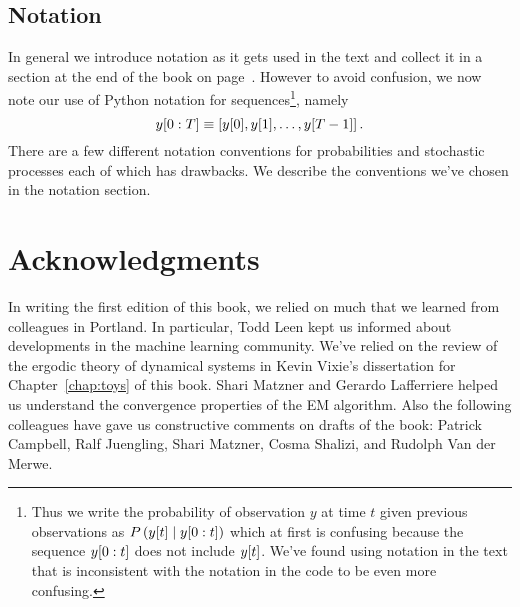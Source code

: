 \documentclass[ltxbook, commentsvisible]{hmmdsbook}
\begin{document}

\subsection*{Notation}
\label{preface_notation}

In general we introduce notation as it gets used in the text and
collect it in a section at the end of the book on
page~\pageref{sec:notation}.  However to avoid confusion, we now note
our use of Python notation for sequences\footnote{Thus we write the
  probability of observation $y$ at time $t$ given previous
  observations as $P\left( {y}{[t]} \mid y[0:t] \right)$
  which at first is confusing because the sequence $y[0:t]$ does
  not include ${y}{[t]}$.  We've found using notation in the text
  that is inconsistent with the notation in the code to be even more
  confusing.}, namely
\begin{equation*}
  y[0:T] \equiv \left[ y[0], y[1], \ldots, y[T-1] \right].
\end{equation*}
There are a few different notation conventions for probabilities and
stochastic processes each of which has drawbacks.  We describe the
conventions we've chosen in the notation section.

\section*{Acknowledgments}
%
\label{sec:ack}
\longpage%

In writing the first edition of this book, we relied on much that we
learned from colleagues in Portland.  In particular, Todd Leen kept us
informed about developments in the machine learning community.  We've
relied on the review of the ergodic theory of dynamical systems in
Kevin Vixie's dissertation\cite{vixie02} for Chapter~\ref{chap:toys}
of this book.  Shari Matzner and Gerardo Lafferriere helped us
understand the convergence properties of the EM algorithm.  Also the
following colleagues have gave us constructive comments on drafts of
the book:
% 
Patrick Campbell, %
Ralf Juengling, %
Shari Matzner, %
Cosma Shalizi, %
and %
Rudolph Van der Merwe. %
\end{document}
